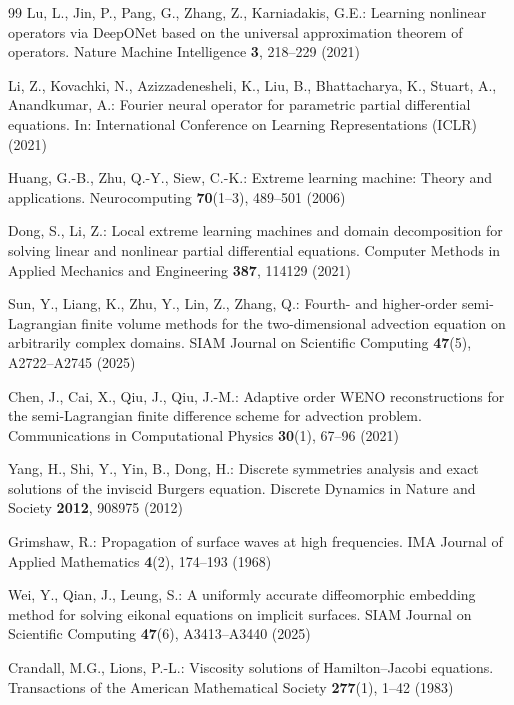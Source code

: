 \documentclass[pdflatex,sn-mathphys-num]{sn-jnl}%
\theoremstyle{thmstyleone}%
\theoremstyle{thmstyletwo}%
\theoremstyle{thmstylethree}%
\begin{document}
{\begin{thebibliography}{99}
Lu, L., Jin, P., Pang, G., Zhang, Z., Karniadakis, G.E.: Learning nonlinear operators via DeepONet based on the universal approximation theorem of operators. Nature Machine Intelligence \textbf{3}, 218--229 (2021)

Li, Z., Kovachki, N., Azizzadenesheli, K., Liu, B., Bhattacharya, K., Stuart, A., Anandkumar, A.: Fourier neural operator for parametric partial differential equations. In: International Conference on Learning Representations (ICLR) (2021)

Huang, G.-B., Zhu, Q.-Y., Siew, C.-K.: Extreme learning machine: Theory and applications. Neurocomputing \textbf{70}(1--3), 489--501 (2006)

Dong, S., Li, Z.: Local extreme learning machines and domain decomposition for solving linear and nonlinear partial differential equations. Computer Methods in Applied Mechanics and Engineering \textbf{387}, 114129 (2021)

Sun, Y., Liang, K., Zhu, Y., Lin, Z., Zhang, Q.: Fourth- and higher-order semi-Lagrangian finite volume methods for the two-dimensional advection equation on arbitrarily complex domains. SIAM Journal on Scientific Computing \textbf{47}(5), A2722--A2745 (2025)

Chen, J., Cai, X., Qiu, J., Qiu, J.-M.: Adaptive order WENO reconstructions for the semi-Lagrangian finite difference scheme for advection problem. Communications in Computational Physics \textbf{30}(1), 67--96 (2021)

Yang, H., Shi, Y., Yin, B., Dong, H.: Discrete symmetries analysis and exact solutions of the inviscid Burgers equation. Discrete Dynamics in Nature and Society \textbf{2012}, 908975 (2012)

Grimshaw, R.: Propagation of surface waves at high frequencies. IMA Journal of Applied Mathematics \textbf{4}(2), 174--193 (1968)

Wei, Y., Qian, J., Leung, S.: A uniformly accurate diffeomorphic embedding method for solving eikonal equations on implicit surfaces. SIAM Journal on Scientific Computing \textbf{47}(6), A3413--A3440 (2025)

Crandall, M.G., Lions, P.-L.: Viscosity solutions of Hamilton--Jacobi equations. Transactions of the American Mathematical Society \textbf{277}(1), 1--42 (1983)


\end{thebibliography}}
\end{document}
